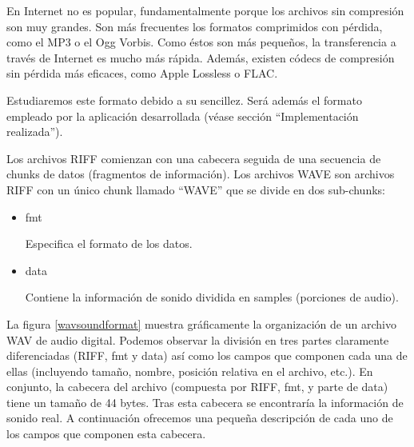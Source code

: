 \documentclass[12pt]{article}
\begin{document}
En Internet no es popular, fundamentalmente porque los archivos sin compresión son muy grandes. Son más frecuentes los formatos comprimidos con pérdida, como el MP3 o el Ogg Vorbis. Como éstos son más pequeños, la transferencia a través de Internet es mucho más rápida. Además, existen códecs de compresión sin pérdida más eficaces, como Apple Lossless o FLAC.

Estudiaremos este formato debido a su sencillez. Será además el formato empleado por la aplicación desarrollada (véase sección ``Implementación realizada'').

Los archivos RIFF comienzan con una cabecera seguida de una secuencia de chunks de datos (fragmentos de información). Los archivos WAVE son archivos RIFF con un único chunk llamado ``WAVE'' que se divide en dos sub-chunks:

\begin{itemize}

\item fmt

Especifica el formato de los datos.

\item data

Contiene la información de sonido dividida en samples (porciones de audio).

\end{itemize}

La figura \ref{wavsoundformat} muestra gráficamente la organización de un archivo WAV de audio digital. Podemos observar la división en tres partes claramente diferenciadas (RIFF, fmt y data) así como los campos que componen cada una de ellas (incluyendo tamaño, nombre, posición relativa en el archivo, etc.). En conjunto, la cabecera del archivo (compuesta por RIFF, fmt, y parte de data) tiene un tamaño de 44 bytes. Tras esta cabecera se encontraría la información de sonido real. A continuación ofrecemos una pequeña descripción de cada uno de los campos que componen esta cabecera.
\end{document}
